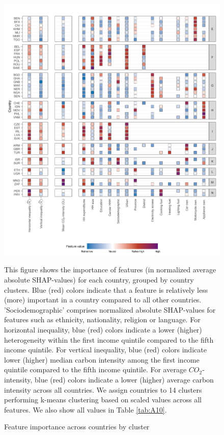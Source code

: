 \documentclass[12pt, a4paper]{article}
\newenvironment{subcaption}
{\strut
\vspace{-5pt}
\begin{minipage}[b]{0.9\textwidth}
  \hspace*{-\parindent}
  \footnotesize}
 {\end{minipage}}
\begin{document}
\begin{figure}[ht!]
    \centering
    \includegraphics{Figure 4/Figure_4_2}
    \caption{Feature importance across countries by cluster}
    \label{fig:fig_4_2}
    \begin{subcaption}
    This figure shows the importance of features (in normalized average absolute SHAP-values) for each country, grouped by country clusters. Blue (red) colors indicate that a feature is relatively less (more) important in a country compared to all other countries. 'Sociodemographic' comprises normalized absolute SHAP-values for features such as ethnicity, nationality, religion or language.
    For horizontal inequality, blue (red) colors indicate a lower (higher) heterogeneity within the first income quintile compared to the fifth income quintile. For vertical inequality, blue (red) colors indicate lower (higher) median carbon intensity among the first income quintile compared to the fifth income quintile. For average $CO_{2}$-intensity, blue (red) colors indicate a lower (higher) average carbon intensity across all countries.
    We assign countries to 14 clusters performing k-means clustering based on scaled values across all features. We also show all values in Table \ref{tab:A10}.
    \end{subcaption}
\end{figure}
\end{document}
